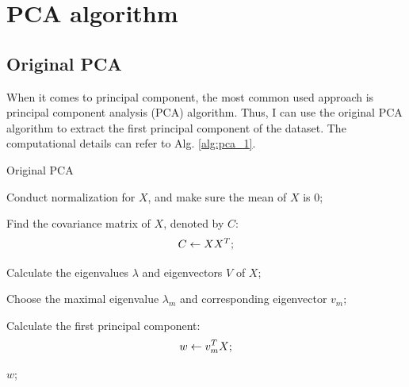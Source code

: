 \documentclass[12pt,a4paper]{article}
\theoremstyle{definition}
\begin{document}
\noindent
\noindent{}

\section{PCA algorithm}

\subsection{Original PCA}
When it comes to principal component, the most common used approach is principal component analysis (PCA) algorithm. Thus, I can use the original PCA algorithm to extract the first principal component of the dataset. The computational details can refer to Alg. \ref{alg:pca_1}.

\vspace{0.01\linewidth}
\begin{algorithm}[H]
	\caption{Original PCA}
	\label{alg:pca_1}
	\vspace{0.25\baselineskip}
	
	
	Conduct normalization for $X$, and make sure the mean of $X$ is 0;
	
	Find the covariance matrix of $X$, denoted by $C$:
	\begin{equation*}
		\centering
		C \leftarrow XX^{T};
	\end{equation*}
	
	Calculate the eigenvalues $\lambda$ and eigenvectors $V$ of $X$;
	
	Choose the maximal eigenvalue $\lambda_{m}$ and corresponding eigenvector $v_{m}$;
	
	Calculate the first principal component:
	\begin{equation*}
		\centering
		w \leftarrow v_{m}^{T}X;
	\end{equation*}
	
	\Return $w$;
\end{algorithm}
\vspace{0.01\linewidth}
\end{document}
